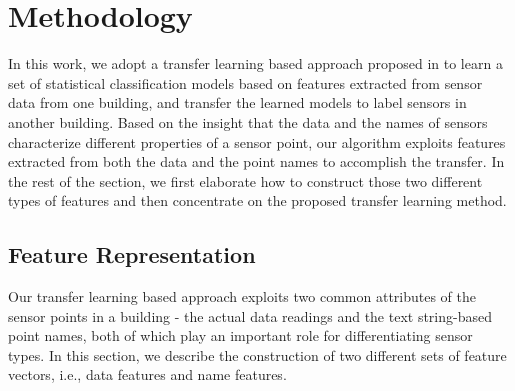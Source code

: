 \section{Methodology}
In this work, we adopt a transfer learning based approach proposed in \cite{lwe} to learn a set of statistical classification models based on features extracted from sensor data from
one building, and transfer the learned models to label sensors in another building.
Based on the insight that the data and the names of sensors characterize different properties of a sensor point, our algorithm exploits features extracted from both the data and the point names to accomplish the transfer.
In the rest of the section, we first elaborate how to construct those two different types of features and then concentrate on the proposed transfer learning method.

\subsection{Feature Representation}\label{feature}
Our transfer learning based approach exploits two common attributes of the sensor points in a building - the actual data readings and the text string-based point names, both of which play an important role for differentiating sensor types.
In this section, we describe the construction of two different sets of feature vectors, i.e., data features and name features.


